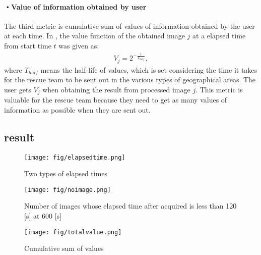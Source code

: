 \documentclass{ieeeaccess}
\begin{document}
\paragraph*{・Value of information obtained by user}
The third metric is cumulative sum of values of information obtained by the user at each time.
In \cite{NOMURA2001}, the value function of the obtained image $j$ at a elapsed time from start time $t$ was given as:
\begin{align}
V_j=2^{-\frac{t}{T_{half}}}, \label{eq_value}
\end{align}
where $T_{half}$ means the half-life of values, which is set considering the time it takes for the rescue team to be sent out in the various types of geographical areas. 
The user gets $V_j$ when obtaining the result from processed image $j$. 
This metric is valuable for the rescue team because they need to get as many values of information as possible when they are sent out.

\subsection{result}

\begin{figure}[t]
\begin{center}
\texttt{[image: fig/elapsedtime.png]}
\caption{Two types of elapsed times}
\label{elapsed}
\end{center}
\end{figure}

\begin{figure*}[t]
\begin{center}
\texttt{[image: fig/noimage.png]}
\caption{Number of images whose elapsed time after acquired is less than 120 [s]  at 600 [s]}
\label{totalnumber}
\end{center}
\end{figure*}

\begin{figure*}[t]
\begin{center}
\texttt{[image: fig/totalvalue.png]}
\caption{Cumulative sum of values}
\label{totalvalue}
\end{center}
\end{figure*}
\end{document}
